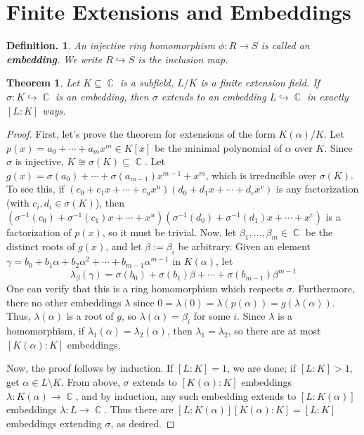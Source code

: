 \documentclass[11pt, a4paper]{memoir}
\DeclareMathOperator{\C}{{\mathbb{C}}}
\theoremstyle{change}
\newtheorem{theorem}{Theorem}[section]
\theoremstyle{plain}
\theoremstyle{nonumberplain}
\newtheorem{definition}{Definition.}
\newtheorem{proof}{Proof}
\begin{document}
\section{Finite Extensions and Embeddings}
\begin{definition}
    An injective ring homomorphism $\phi:R\to S$ is called an \textbf{embedding}.
    We write $R\hookrightarrow S$ is the inclusion map.
\end{definition}
\begin{theorem}
    Let $K\subseteq\C$ is a subfield, $L/K$ is a finite extension field.
    If $\sigma:K\hookrightarrow \C$ is an embedding, then $\sigma$ extends to an embedding $L\hookrightarrow \C$ in exactly $[L:K]$ ways.
\end{theorem}
\begin{proof}
    First, let's prove the theorem for extensions of the form $K(\alpha)/K$.
    Let $p(x)=a_0+\cdots+a_mx^m\in K[x]$ be the minimal polynomial of $\alpha$ over $K$.
    Since $\sigma$ is injective, $K\cong\sigma(K)\subseteq\C$.
    Let $g(x)=\sigma(a_0)+\cdots+\sigma(a_{m-1})x^{m-1}+x^m$, which is irreducible over $\sigma(K)$.
    To see this, if $(c_0+c_1x+\cdots+c_u x^u)(d_0+d_1x+\cdots+d_vx^v)$ is any factorization (with $c_i,d_i\in\sigma(K)$), then $(\sigma^{-1}(c_0)+\sigma^{-1}(c_1)x+\cdots+x^u)(\sigma^{-1}(d_0)+\sigma^{-1}(d_1)x+\cdots+x^v)$ is a factorization of $p(x)$, so it must be trivial.
    Now, let $\beta_1,\ldots,\beta_m\in\C$ be the distinct roots of $g(x)$, and let $\beta:=\beta_i$ be arbitrary.
    Given an element $\gamma=b_0+b_1\alpha+b_2\alpha^2+\cdots+b_{m-1}\alpha^{m-1}$ in $K(\alpha)$, let
    \begin{equation*}\lambda_\beta(\gamma)=\sigma(b_0)+\sigma(b_1)\beta+\cdots+\sigma(b_{m-1})\beta^{m-1}\end{equation*}
    One can verify that this is a ring homomorphism which respects $\sigma$.
    Furthermore, there no other embeddings $\lambda$ since $0=\lambda(0)=\lambda(p(\alpha))=g(\lambda(\alpha))$.
    Thus, $\lambda(\alpha)$ is a root of $g$, so $\lambda(\alpha)=\beta_i$ for some $i$.
    Since $\lambda$ is a homomorphism, if $\lambda_1(\alpha)=\lambda_2(\alpha)$, then $\lambda_1=\lambda_2$, so there are at most $[K(\alpha):K]$ embeddings.

    Now, the proof follows by induction.
    If $[L:K]=1$, we are done; if $[L:K]>1$, get $\alpha\in L\setminus K$.
    From above, $\sigma$ extends to $[K(\alpha):K]$ embeddings $\lambda:K(\alpha)\to\C$, and by induction, any such embedding extends to $[L:K(\alpha)]$ embeddings $\lambda:L\to\C$.
    Thus there are $[L:K(\alpha)][K(\alpha):K]=[L:K]$ embeddings extending $\sigma$, as desired.
\end{proof}
\end{document}
